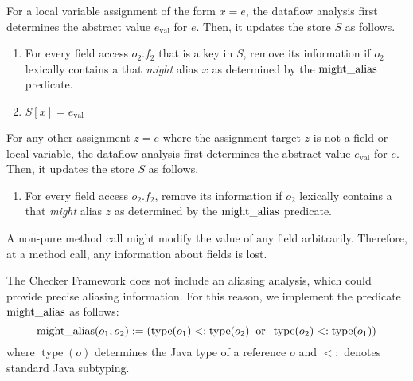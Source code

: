 
For a local variable assignment of the form $x = e$,
the dataflow analysis first determines the abstract value $e_\text{val}$ for
$e$.
Then, it updates the store $S$ as follows.
\begin{enumerate}
    \item For every field access $o_2.f_2$ that is a key in $S$, remove its information if
    $o_2$ lexically contains a  that \emph{might}
    alias $x$ as determined by the $\operatorname{might\_alias}$
    predicate.
    \item $S[x] = e_\text{val}$
\end{enumerate}


For any other assignment $z = e$ where the
assignment target $z$ is not a field or local variable,
the dataflow analysis first determines the abstract value $e_\text{val}$ for
$e$.
Then, it updates the store $S$ as follows.
\begin{enumerate}
    \item For every field access $o_2.f_2$, remove its information if
    $o_2$ lexically contains a  that \emph{might}
    alias $z$ as determined by the $\operatorname{might\_alias}$ predicate.
\end{enumerate}



A non-pure method call might modify the value of any field arbitrarily.
Therefore, at a method call, any information about fields is lost.


\label{sec:alias}

The Checker Framework does not include an aliasing analysis, which could
provide precise aliasing information.  For this reason, we implement the
predicate $\operatorname{might\_alias}$ as follows:
\[ \operatorname{might\_alias}(o_1,o_2) :=
\left(\operatorname{type}(o_1) <: \operatorname{type}(o_2)
\;\;\text{or}\;\;
\operatorname{type}(o_2) <: \operatorname{type}(o_1) \right) \]
where $\operatorname{type}(o)$ determines the Java type of a reference $o$
and $<:$ denotes standard Java subtyping.



